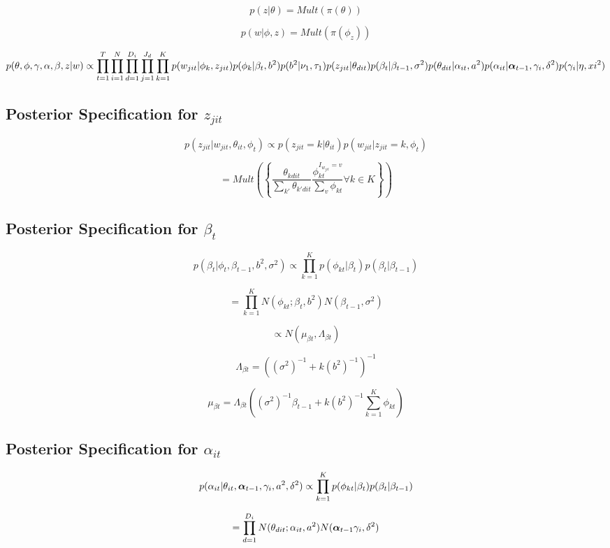 \documentclass[a4paper]{article}
\begin{document}
\[p(z| \theta) = Mult(\pi(\theta))\]

\[p(w | \phi, z) = Mult(\pi(\phi_z))\]

\[p(\theta, \phi, \gamma, \alpha, \beta, z | w) \propto \prod_{t=1}^T \prod_{i=1}^N \prod_{d=1}^{D_i} \prod_{j=1}^{J_d} \prod_{k=1}^K p(w_{jit} | \phi_k, z_{jit}) p(\phi_k | \beta_t, b^2) p(b^2 | \nu_1, \tau_1) p(z_{jit} | \theta_{dit}) p(\beta_t | \beta_{t-1}, \sigma^2) p(\theta_{dit} | \alpha_{it}, a^2) p(\alpha_{it} | \text{\boldmath$\alpha$}_{t-1}, \gamma_i, \delta^2) p(\gamma_i | \eta, xi^2)\]

\subsection{Posterior Specification for $z_{jit}$}

\[p(z_{jit} | w_{jit}, \theta_{it}, \phi_t) \propto p(z_{jit} = k | \theta_{it}) p(w_{jit} | z_{jit} = k, \phi_t)\]

\[= Mult\left(\left\{\frac{\theta_{kdit}}{\sum_{k'} \theta_{k'dit}}\frac{\phi_{kt}^{I_{w_{jit}}=v}}{\sum_v \phi_{kt}} \forall k \in K \right\}\right)\]

\subsection{Posterior Specification for $\beta_t$}

\[p(\beta_t | \phi_t, \beta_{t-1}, b^2, \sigma^2) \propto \prod_{k=1}^K p(\phi_{kt} | \beta_t) p(\beta_t | \beta_{t-1})\]

\[= \prod_{k=1}^K N(\phi_{kt};\beta_t, b^2) N(\beta_{t-1}, \sigma^2)\]

\[\propto N(\mu_{\beta t}, \Lambda_{\beta t})\]

\[\Lambda_{\beta t} = ((\sigma^2)^{-1} + k (b^2)^{-1})^{-1}\]

\[\mu_{\beta t} = \Lambda_{\beta t} \left((\sigma^2)^{-1}\beta_{t-1} + k (b^2)^{-1} \sum_{k=1}^K \phi_{kt}\right) \]

\subsection{Posterior Specification for $\alpha_{it}$}

\[p(\alpha_{it} | \theta_{it}, \text{\boldmath$\alpha$}_{t-1}, \gamma_i, a^2, \delta^2) \propto \prod_{k=1}^K p(\phi_{kt} | \beta_t) p(\beta_t | \beta_{t-1})\]

\[= \prod_{d=1}^{D_i} N(\theta_{dit};\alpha_{it}, a^2) N(\text{\boldmath$\alpha$}_{t-1}\gamma_i, \delta^2)\]
\end{document}
